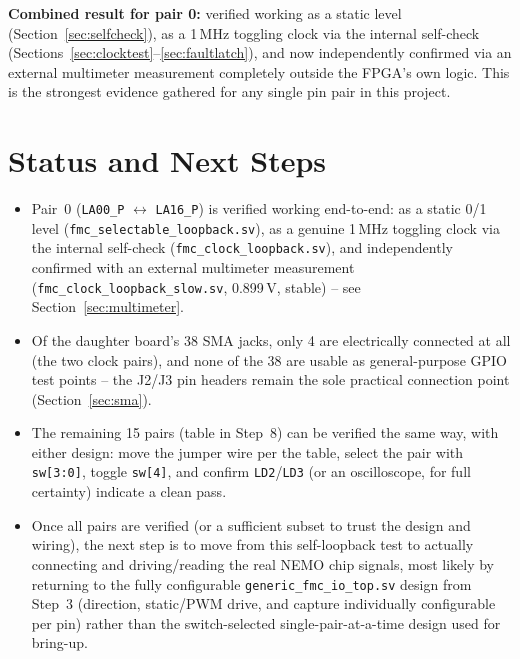 \documentclass[11pt]{article}
\begin{document}
\textbf{Combined result for pair 0:} verified working as a static level
(Section~\ref{sec:selfcheck}), as a 1\,MHz toggling clock via the internal self-check
(Sections~\ref{sec:clocktest}--\ref{sec:faultlatch}), and now independently confirmed via
an external multimeter measurement completely outside the FPGA's own logic. This is the
strongest evidence gathered for any single pin pair in this project.

\section{Status and Next Steps}

\begin{itemize}
    \item Pair~0 (\texttt{LA00\_P} $\leftrightarrow$ \texttt{LA16\_P}) is verified working
    end-to-end: as a static 0/1 level (\texttt{fmc\_selectable\_loopback.sv}), as a
    genuine 1\,MHz toggling clock via the internal self-check
    (\texttt{fmc\_clock\_loopback.sv}), and independently confirmed with an external
    multimeter measurement (\texttt{fmc\_clock\_loopback\_slow.sv}, 0.899\,V, stable) --
    see Section~\ref{sec:multimeter}.
    \item Of the daughter board's 38 SMA jacks, only 4 are electrically connected at all
    (the two clock pairs), and none of the 38 are usable as general-purpose GPIO test
    points -- the J2/J3 pin headers remain the sole practical connection point
    (Section~\ref{sec:sma}).
    \item The remaining 15 pairs (table in Step~8) can be verified the same way, with
    either design: move the jumper wire per the table, select the pair with
    \texttt{sw[3:0]}, toggle \texttt{sw[4]}, and confirm \texttt{LD2}/\texttt{LD3}
    (or an oscilloscope, for full certainty) indicate a clean pass.
    \item Once all pairs are verified (or a sufficient subset to trust the design and
    wiring), the next step is to move from this self-loopback test to actually connecting
    and driving/reading the real NEMO chip signals, most likely by returning to the
    fully configurable \texttt{generic\_fmc\_io\_top.sv} design from Step~3 (direction,
    static/PWM drive, and capture individually configurable per pin) rather than the
    switch-selected single-pair-at-a-time design used for bring-up.
\end{itemize}
\end{document}
